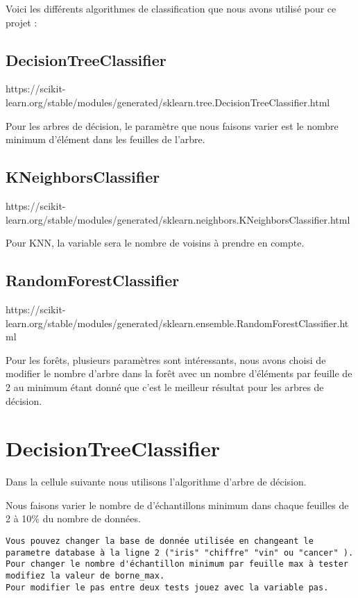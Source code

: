 \documentclass[11pt]{article}
\begin{document}
Voici les différents algorithmes de classification que nous avons
utilisé pour ce projet :

\subsection{DecisionTreeClassifier}\label{decisiontreeclassifier}

https://scikit-learn.org/stable/modules/generated/sklearn.tree.DecisionTreeClassifier.html

Pour les arbres de décision, le paramètre que nous faisons varier est le
nombre minimum d'élément dans les feuilles de l'arbre.

\subsection{KNeighborsClassifier}\label{kneighborsclassifier}

https://scikit-learn.org/stable/modules/generated/sklearn.neighbors.KNeighborsClassifier.html

Pour KNN, la variable sera le nombre de voisins à prendre en compte.

\subsection{RandomForestClassifier}\label{randomforestclassifier}

https://scikit-learn.org/stable/modules/generated/sklearn.ensemble.RandomForestClassifier.html

Pour les forêts, plusieurs paramètres sont intéressants, nous avons
choisi de modifier le nombre d'arbre dans la forêt avec un nombre
d'éléments par feuille de 2 au minimum étant donné que c'est le meilleur
résultat pour les arbres de décision.

    \section{DecisionTreeClassifier}\label{decisiontreeclassifier}

Dans la cellule suivante nous utilisons l'algorithme d'arbre de
décision.

Nous faisons varier le nombre de d'échantillons minimum dans chaque
feuilles de 2 à 10\% du nombre de données.

\begin{verbatim}
Vous pouvez changer la base de donnée utilisée en changeant le parametre database à la ligne 2 ("iris" "chiffre" "vin" ou "cancer" ).
Pour changer le nombre d'échantillon minimum par feuille max à tester modifiez la valeur de borne_max.
Pour modifier le pas entre deux tests jouez avec la variable pas.
\end{verbatim}
\end{document}

